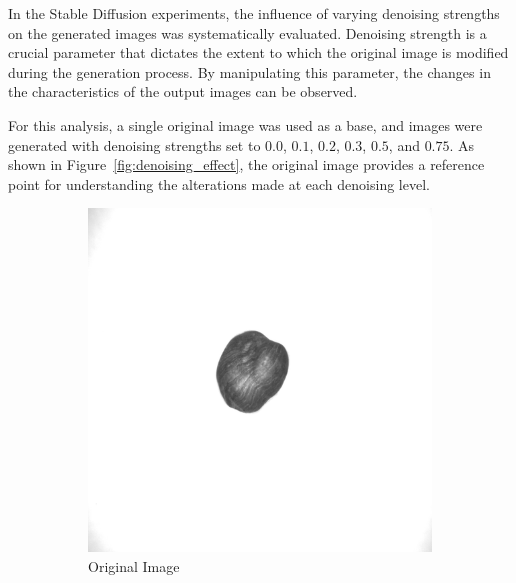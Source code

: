 \documentclass[12pt,DIV14,BCOR12mm,a4paper,footinclude=false,headinclude,parskip=half-,twoside,openright,cleardoublepage=empty,toc=index,bibliography=totoc,listof=totoc]{scrreprt}
\numberwithin{equation}{chapter}
\begin{document}
In the Stable Diffusion experiments, the influence of varying denoising strengths on the generated images was systematically evaluated. Denoising strength is a crucial parameter that dictates the extent to which the original image is modified during the generation process. By manipulating this parameter, the changes in the characteristics of the output images can be observed.

For this analysis, a single original image was used as a base, and images were generated with denoising strengths set to $0.0$, $0.1$, $0.2$, $0.3$, $0.5$, and $0.75$. As shown in Figure~\ref{fig:denoising_effect}, the original image provides a reference point for understanding the alterations made at each denoising level.
\begin{figure}
    \centering
    \begin{subfigure}[t]{0.23\textwidth} %
        \centering
        \includegraphics[width=\linewidth]{../media/image_original.png} %
        \caption{Original Image}
    \end{subfigure}
    \begin{subfigure}[t]{0.23\textwidth} %
        \centering

\end{subfigure}
\end{figure}
\end{document}

